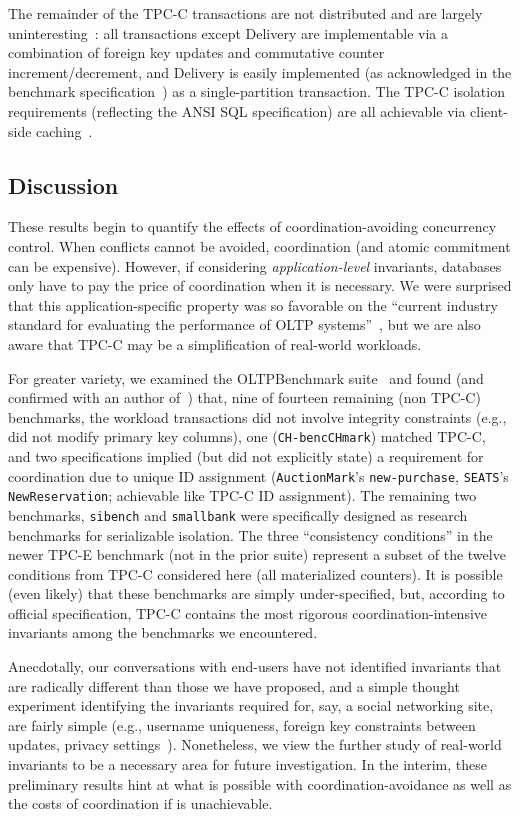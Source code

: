  The remainder of the TPC-C
transactions are not distributed and are largely
uninteresting~\cite{calvin}: all transactions except Delivery are
implementable via a combination of foreign key updates and commutative
counter increment/decrement, and Delivery is easily implemented (as
acknowledged in the benchmark specification~\cite{tpcc}) as a
single-partition transaction. The TPC-C isolation requirements
(reflecting the ANSI SQL specification) are all achievable via
client-side caching~\cite{hat-vldb}.

\subsection{Discussion}

These results begin to quantify the effects of coordination-avoiding
concurrency control. When conflicts cannot be avoided, coordination
(and atomic commitment can be expensive). However, if considering
\textit{application-level} invariants, databases only have to pay the
price of coordination when it is necessary. We were surprised that
this application-specific property was so favorable on the ``current
industry standard for evaluating the performance of OLTP
systems''~\cite{oltpbench}, but we are also aware that TPC-C may be a
simplification of real-world workloads.

For greater variety, we examined the OLTPBenchmark
suite~\cite{oltpbench} and found (and confirmed with an author
of~\cite{oltpbench}) that, nine of fourteen remaining (non TPC-C)
benchmarks, the workload transactions did not involve integrity
constraints (e.g., did not modify primary key columns), one
(\texttt{CH-bencCHmark}) matched TPC-C, and two specifications implied
(but did not explicitly state) a requirement for coordination due to
unique ID assignment (\texttt{AuctionMark}'s \texttt{new-purchase},
\texttt{SEATS}'s \texttt{NewReservation}; achievable like TPC-C ID
assignment). The remaining two benchmarks, \texttt{sibench} and
\texttt{smallbank} were specifically designed as research benchmarks
for serializable isolation. The three ``consistency conditions'' in
the newer TPC-E benchmark (not in the prior suite) represent a subset
of the twelve conditions from TPC-C considered here (all materialized
counters). It is possible (even likely) that these benchmarks are
simply under-specified, but, according to official specification,
TPC-C contains the most rigorous coordination-intensive invariants
among the benchmarks we encountered.

Anecdotally, our conversations with end-users have not identified
invariants that are radically different than those we have proposed,
and a simple thought experiment identifying the invariants required
for, say, a social networking site, are fairly simple (e.g., username
uniqueness, foreign key constraints between updates, privacy
settings~\cite{pnuts}). Nonetheless, we view the further study of
real-world invariants to be a necessary area for future
investigation. In the interim, these preliminary results hint at what
is possible with coordination-avoidance as well as the costs of
coordination if \cfreedom is unachievable.


